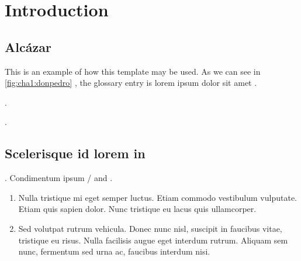 % 
% 
% 



\clearpage
\cleardoublepage

\chapter{Introduction}

\section{Alcázar}

This is an example of how this template may be used. As we can see in \autoref{fig:cha1:donpedro} \cite{cubesat-impact-astronomy, lora-phy-understanding}, the glossary entry  is lorem ipsum dolor sit amet  \cite{nasa-soa2023-avionics, book-product-devel, maral-satcoms, solder-defects}.

\lipsum[12] \cite{cubesat-impact-astronomy}.


\lipsum[1] \cite{solder-defects}.

\section{Scelerisque id lorem in}

\lipsum[13]. Condimentum ipsum / and  \cite{grounding-schemes-sats}. 

\begin{enumerate}
    \item Nulla tristique mi eget semper luctus. Etiam commodo vestibulum vulputate. Etiam quis sapien dolor. Nunc tristique eu lacus quis ullamcorper. 
    \item Sed volutpat rutrum vehicula. Donec nunc nisl, suscipit in faucibus vitae, tristique eu risus. Nulla facilisis augue eget interdum rutrum. Aliquam sem nunc, fermentum sed urna ac, faucibus interdum nisi.
\end{enumerate}

